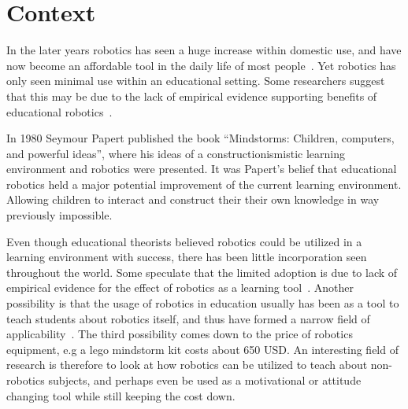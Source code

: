 \section{Context}
	In the later years robotics has seen a huge increase within domestic use, and have now become an affordable tool in the daily life of most people~\cite{kara2003sizing,hsiu2003designing}.
	Yet robotics has only seen minimal use within an educational setting. Some researchers suggest that this may be due to the lack of empirical evidence
	supporting benefits of educational robotics~\cite{williams2007acquisition}. 
	
\bigskip\noindent
In 1980 Seymour Papert published the book ``Mindstorms: Children, computers, and powerful ideas''\cite{papert1980mindstorms}, where his ideas of a constructionismistic 
learning environment and robotics were presented. It was Papert's belief that educational robotics held a major potential improvement of the current learning environment.
Allowing children to interact and construct their their own knowledge in way previously impossible. 

\bigskip\noindent
Even though educational theorists believed robotics could be utilized in a learning environment with success, there has been little
incorporation seen throughout the world. 
Some speculate that the limited adoption is due to lack of empirical evidence for the effect of robotics as a learning tool~\cite{williams2007acquisition}.  
Another possibility is that the usage of robotics in education usually has been as a tool to teach students about robotics itself, 
and thus have formed a narrow field of applicability~\cite{rusk2008new}. 
The third possibility comes down to the price of robotics equipment, e.g a lego mindstorm kit costs about 650 USD. 
An interesting field of research is therefore to look at how robotics can be utilized to teach about non-robotics subjects, and perhaps even be used as a motivational or attitude changing tool while still keeping the cost down. 

	
